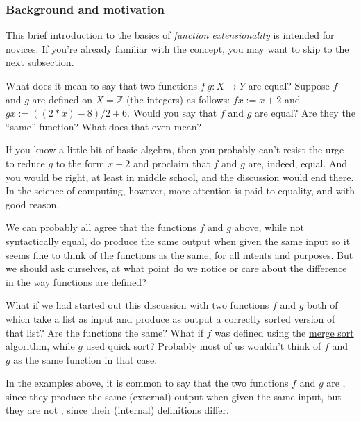 \subsubsection{Background and motivation}\label{background-and-motivation}
This brief introduction to the basics of \emph{function extensionality} is intended for novices. If you're already familiar with the concept, you may want to skip to the next subsection.

What does it mean to say that two functions \(f\ g \colon X → Y\) are equal? Suppose $f$ and \(g\) are defined on \(X = ℤ\) (the integers) as follows: \(f x := x + 2\) and \(g x := ((2 * x) - 8)/2 + 6\). Would you say that \(f\) and \(g\) are equal?  Are they the ``same'' function?  What does that even mean?

If you know a little bit of basic algebra, then you probably can't resist the urge to reduce \(g\) to the form \(x + 2\) and proclaim that \(f\) and \(g\) are, indeed, equal. And you would be right, at least in middle school,
and the discussion would end there. In the science of computing, however, more attention is paid to equality, and with good reason.

We can probably all agree that the functions \(f\) and \(g\) above, while not syntactically equal, do produce the same output when given the same input so it seems fine to think of the functions as the same, for all intents and purposes. But we should ask ourselves, at what point do we notice or care about the difference in the way functions are defined?

What if we had started out this discussion with two functions \(f\) and \(g\) both of which take a list as input and produce as output a correctly sorted version of that list? Are the functions the same? What if \(f\) was defined using the \href{https://en.wikipedia.org/wiki/Merge_sort}{merge sort} algorithm, while \(g\) used \href{https://en.wikipedia.org/wiki/Quicksort}{quick sort}? Probably most of us wouldn't think of \(f\) and \(g\) as the same function in that case.

In the examples above, it is common to say that the two functions \(f\) and \(g\) are \href{https://en.wikipedia.org/wiki/Extensionality}{}, since they produce the same (external) output when given the same input, but they are not \href{https://en.wikipedia.org/wiki/Intension}{}, since their (internal) definitions differ.

